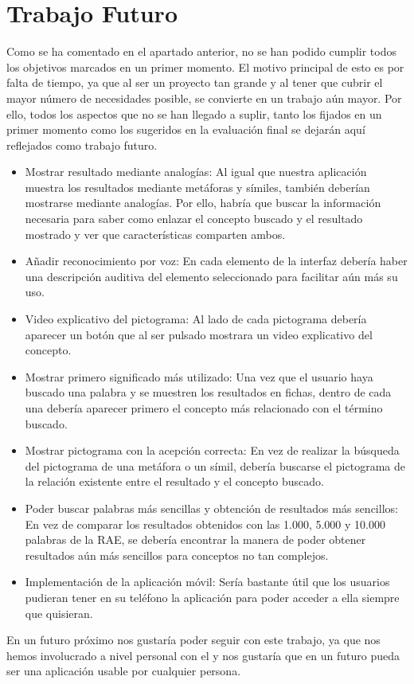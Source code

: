 	

\section{Trabajo Futuro}
\label{cap:sec:TrabajoFuturo}

Como se ha comentado en el apartado anterior, no se han podido cumplir todos los objetivos marcados en un primer momento. El motivo principal de esto es por falta de tiempo, ya que al ser un proyecto tan grande y al tener que cubrir el mayor número de necesidades posible, se convierte en un trabajo aún mayor.
Por ello, todos los aspectos que no se han llegado a suplir, tanto los fijados en un primer momento como los sugeridos en la evaluación final se dejarán aquí reflejados como trabajo futuro. 

\begin{itemize}
	\item Mostrar resultado mediante analogías: Al igual que nuestra aplicación muestra los resultados mediante metáforas y símiles, también deberían mostrarse mediante analogías. Por ello, habría que buscar la información necesaria para saber como enlazar el concepto buscado y el resultado mostrado y ver que características comparten ambos.
	\item Añadir reconocimiento por voz: En cada elemento de la interfaz debería haber una descripción auditiva del elemento seleccionado para facilitar aún más su uso.
	\item Video explicativo del pictograma: Al lado de cada pictograma debería aparecer un botón que al ser pulsado mostrara un video explicativo del concepto.
	\item Mostrar primero significado más utilizado: Una vez que el usuario haya buscado una palabra y se muestren los resultados en fichas, dentro de cada una debería aparecer primero el concepto más relacionado con el término buscado.
	\item Mostrar pictograma con la acepción correcta: En vez de realizar la búsqueda del pictograma de una metáfora o un símil, debería buscarse el pictograma de la relación existente entre el resultado y el concepto buscado.
	\item Poder buscar palabras más sencillas y obtención de resultados más sencillos: En vez de comparar los resultados obtenidos con las 1.000, 5.000 y 10.000 palabras de la RAE, se debería encontrar la manera de poder obtener resultados aún más sencillos para conceptos no tan complejos.
	\item Implementación de la aplicación móvil: Sería bastante útil que los usuarios pudieran tener en su teléfono la aplicación para poder acceder a ella siempre que quisieran.
	
	
	
\end{itemize}


En un futuro próximo nos gustaría poder seguir con este trabajo, ya que nos hemos involucrado a nivel personal con el y nos gustaría que en un futuro pueda ser una aplicación usable por cualquier persona.

